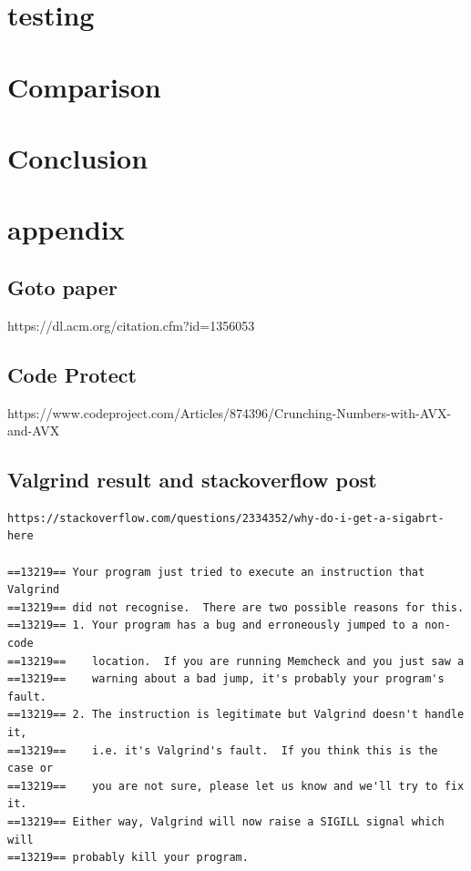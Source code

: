 \documentclass[a4paper,10pt,titlepage]{report}
\begin{document}
\section{testing}


\section{Comparison}

\section{Conclusion}


\newpage
\section{appendix}
\subsection{Goto paper }
https://dl.acm.org/citation.cfm?id=1356053 \\
\subsection{Code Protect}
https://www.codeproject.com/Articles/874396/Crunching-Numbers-with-AVX-and-AVX
\subsection{Valgrind result and stackoverflow post}

\begin{lstlisting}
https://stackoverflow.com/questions/2334352/why-do-i-get-a-sigabrt-here

==13219== Your program just tried to execute an instruction that Valgrind
==13219== did not recognise.  There are two possible reasons for this.
==13219== 1. Your program has a bug and erroneously jumped to a non-code
==13219==    location.  If you are running Memcheck and you just saw a
==13219==    warning about a bad jump, it's probably your program's fault.
==13219== 2. The instruction is legitimate but Valgrind doesn't handle it,
==13219==    i.e. it's Valgrind's fault.  If you think this is the case or
==13219==    you are not sure, please let us know and we'll try to fix it.
==13219== Either way, Valgrind will now raise a SIGILL signal which will
==13219== probably kill your program.
\end{lstlisting}
\end{document}

